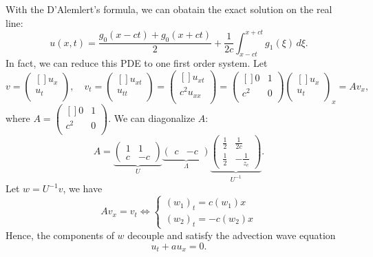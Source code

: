 With the D'Alemlert's formula, we can obatain the exact solution on the real line: 
\[
    u(x, t)=\frac{g_0(x-c t)+g_0(x+c t)}{2}+\frac{1}{2 c} \int_{x-c t}^{x+c t} g_1(\xi) \,d \xi. 
\]
In fact, we can reduce this PDE to one first order system. Let 
\[
    v = \begin{pmatrix}[] 
         u_x \\
         u_t \\
    \end{pmatrix}, \quad v_t = \begin{pmatrix}[] 
         u_{xt} \\
         u_{tt} \\
    \end{pmatrix} = \begin{pmatrix}[] 
         u_{xt} \\
         c^{2}  u_{xx} \\
    \end{pmatrix} = \begin{pmatrix}[] 
        0 &  1 \\
        c^{2}  &  0 \\
    \end{pmatrix} \begin{pmatrix}[] 
         u_x \\
         u_t \\
    \end{pmatrix}_x = Av_x,    
\]
where $ A = \begin{pmatrix}[] 
    0 &  1 \\
    c^{2}  &  0 \\
\end{pmatrix}$. We can diagonalize $ A $: 
\[
    A=\underbrace{\left(\begin{array}{ll}
        1 & 1 \\
        c & -c
        \end{array}\right)}_U \underbrace{\left(\begin{array}{cc}
        c & -c
        \end{array}\right)}_{\Lambda} \underbrace{\left(\begin{array}{cc}
        \frac{1}{2} & \frac{1}{2 c} \\
        \frac{1}{2} & -\frac{1}{z_c}
        \end{array}\right)}_{U^{-1}}. 
\]
Let $ w = U^{-1} v $, we have 
\[
    Av_x = v_t \Longleftrightarrow 
    \begin{cases}
        (w_1)_t = c(w_1)x \\
        (w_2)_t = -c (w_2)x 
    \end{cases}
\]
Hence, the components of $ w $ decouple and satisfy the advection wave equation
\begin{equation}
\label{eq: advection equation}
    u_t + a u_x = 0.
\end{equation}

